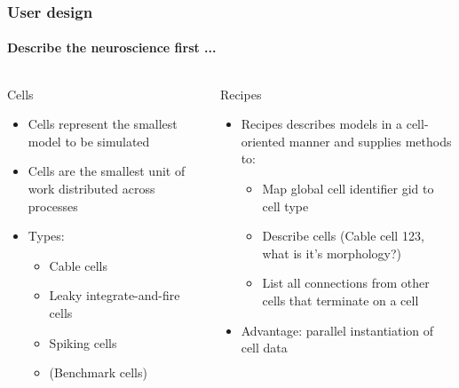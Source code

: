 \documentclass[t]{beamer}
\begin{document}

\begin{frame}\footnotesize
    \frametitle{User design}
    \framesubtitle{Describe the neuroscience first ...}
\begin{columns}
    \begin{column}{0.45\textwidth}
    \begin{block}{Cells}
        \begin{itemize}
        \item Cells represent the smallest model to be simulated
        \item Cells are the smallest unit of work distributed across processes
        \item Types:
            \begin{itemize}\footnotesize
            \item Cable cells
            \item Leaky integrate-and-fire cells
            \item Spiking cells
            \item (Benchmark cells)
            \end{itemize}
        \end{itemize}
    \end{block}
    \end{column}
    \begin{column}{0.55\textwidth}
    \begin{block}{Recipes}
        \begin{itemize}
        \item Recipes describes models in a cell-oriented manner and supplies methods to:
            \begin{itemize}\footnotesize
            \item Map global cell identifier gid to cell type
            \item Describe cells (Cable cell 123, what is it's morphology?)
            \item List all connections from other cells that terminate on a cell
            \end{itemize}
        \item Advantage: parallel instantiation of cell data
        \end{itemize}
    \end{block}
    \end{column}
\end{columns}
\end{frame}
\end{document}
